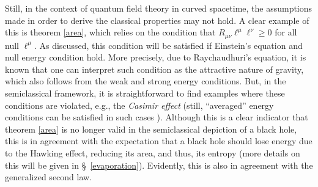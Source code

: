 \documentclass[
12pt,		%
openright,	%
twoside,  %
a4paper,			%
chapter=TITLE,		%
english,			%
french,				%
spanish,			%
brazil				%
]{USPSC-classe/USPSC}
\begin{document}
Still, in the context of quantum field theory in curved spacetime, the assumptions made in order to derive the classical properties may not hold. A clear example of this is theorem \ref{area}, which relies on the condition that $R_{\mu\nu}\ell^{\mu}\ell^{\nu}\geq 0$ for all null $\ell^{\mu}$. As discussed, this condition will be satisfied if Einstein's equation and null energy condition hold. More precisely, due to Raychaudhuri's equation, it is known that one can interpret such condition as the attractive nature of gravity, which also follows from the weak and strong energy conditions. But, in the semiclassical framework, it is straightforward to find examples where these conditions are violated, e.g., the \textit{Casimir effect} \cite{Casimir1948 ,Parker2009} (still, ``averaged'' energy conditions can be satisfied in such cases \cite{Fewster2012}). Although this is a clear indicator that theorem \ref{area} is no longer valid in the semiclassical depiction of a black hole, this is in agreement with the expectation that a black hole should lose energy due to the Hawking effect, reducing its area, and thus, its entropy (more details on this will be given in \S~\ref{evaporation}). Evidently, this is also in agreement with the generalized second law.
\end{document}
